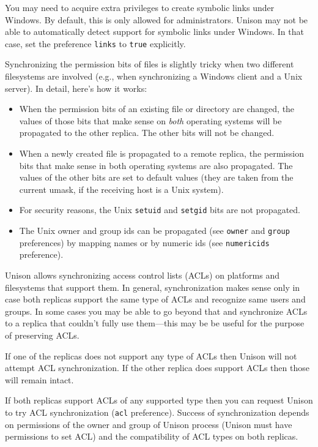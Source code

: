 \documentclass{article}
\begin{document}
You may need to acquire extra privileges to create symbolic links under
Windows. By default, this is only allowed for administrators. Unison may not
be able to automatically detect support for symbolic links under Windows. In
that case, set the preference {\tt links} to {\tt true} explicitly.



Synchronizing the permission bits of files is slightly tricky when two
different filesystems are involved (e.g., when synchronizing a Windows
client and a Unix server).  In detail, here's how it works:
\begin{itemize}
\item When the permission bits of an existing file or directory are
changed, the values of those bits that make sense on {\em both}
operating systems will be propagated to the other replica.  The other
bits will not be changed.
\item When a newly created file is propagated to a remote replica, the
permission bits that make sense in both operating systems are also
propagated.  The values of the other bits are set to default values
(they are taken from the current umask, if the receiving host is a
Unix system).
\item For security reasons, the Unix \verb|setuid| and \verb|setgid|
bits are not propagated.
\item The Unix owner and group ids can be propagated (see \verb|owner|
and \verb|group| preferences) by mapping names or by numeric ids (see
\verb|numericids| preference).
\end{itemize}



Unison allows synchronizing access control lists (ACLs) on platforms
and filesystems that support them. In general, synchronization makes
sense only in case both replicas support the same type of ACLs and
recognize same users and groups. In some cases you may be able to
go beyond that and synchronize ACLs to a replica that couldn't fully
use them---this may be be useful for the purpose of preserving ACLs.

If one of the replicas does not support any type of ACLs then
Unison will not attempt ACL synchronization. If the other replica
does support ACLs then those will remain intact.

If both replicas support ACLs of any supported type then you can
request Unison to try ACL synchronization (\verb|acl| preference).
Success of synchronization depends on permissions of the owner and
group of Unison process (Unison must have permissions to set ACL)
and the compatibility of ACL types on both replicas.
\end{document}
